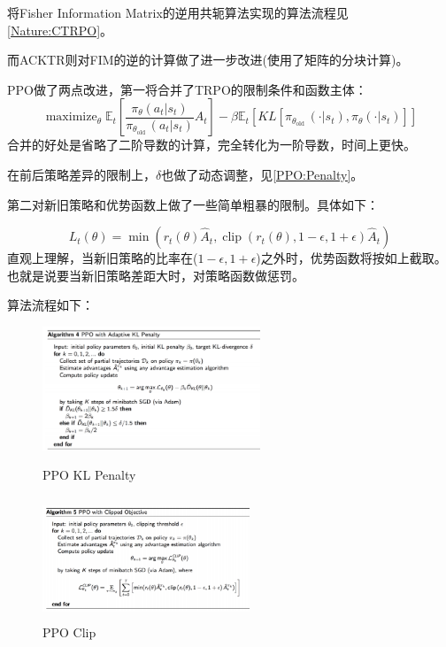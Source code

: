\documentclass[UTF8]{ctexart}
\begin{document}
将Fisher Information Matrix的逆用共轭算法实现的算法流程见\ref{Nature:CTRPO}。


而ACKTR则对FIM的逆的计算做了进一步改进(使用了矩阵的分块计算)。


PPO做了两点改进，第一将合并了TRPO的限制条件和函数主体：
$$\operatorname{maximize}_{\theta} \mathbb{E}_{t}\left[\frac{\pi_{\theta}\left(a_{t} | 
s_{t}\right)}{\pi_{\theta_{\text {old }}}\left(a_{t} | s_{t}\right)} A_{t}\right]-\beta
 \mathbb{E}_{t}\left[K L\left[\pi_{\theta_{\text {old }}}\left(\cdot | s_{t}\right),
  \pi_{\theta}\left(\cdot | s_{t}\right)\right]\right]$$
合并的好处是省略了二阶导数的计算，完全转化为一阶导数，时间上更快。

在前后策略差异的限制上，$\delta$也做了动态调整，见\ref{PPO:Penalty}。

第二对新旧策略和优势函数上做了一些简单粗暴的限制。具体如下：

$$L_{t}(\theta)=\min \left(r_{t}(\theta) \hat{A}_{t}, \operatorname{clip}\left(r_{t}(\theta), 1-\epsilon, 1+\epsilon\right) \hat{A}_{t}\right)$$
直观上理解，当新旧策略的比率在($1-\epsilon, 1+\epsilon$)之外时，优势函数将按如上截取。
也就是说要当新旧策略差距大时，对策略函数做惩罚。

算法流程如下：

\begin{figure}[htbp]
	\centering
	\begin{minipage}[t]{0.48\textwidth}
	\centering
    \includegraphics[width=6.5cm, height=3.7cm]{./pic/PPO_KL.png}
    \caption{PPO KL Penalty}
    \label{PPO:Penalty}
	\end{minipage}
	\begin{minipage}[t]{0.48\textwidth}
		\centering
        \includegraphics[width=6.2cm, height=3.7cm]{./pic/PPO_Clip.png}
        \caption{PPO Clip}
        \label{PPO:Clip}
	\end{minipage}
\end{figure}
\end{document}
